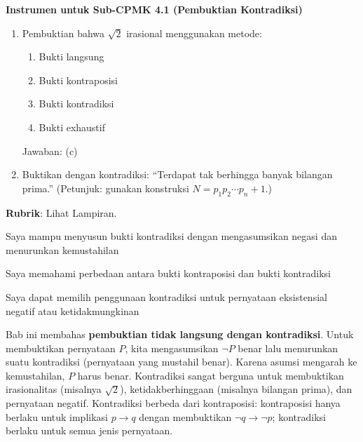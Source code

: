 \documentclass[../main]{subfiles}
\begin{document}
\begin{asesmen}
\textbf{Instrumen untuk Sub-CPMK 4.1 (Pembuktian Kontradiksi)}

\begin{enumerate}
  \item Pembuktian bahwa $\sqrt{2}$ irasional menggunakan metode:
  \begin{enumerate}
    \item Bukti langsung \item Bukti kontraposisi \item Bukti kontradiksi \item Bukti exhaustif
  \end{enumerate}
  Jawaban: (c)

  \item Buktikan dengan kontradiksi: ``Terdapat tak berhingga banyak bilangan prima.'' (Petunjuk: gunakan konstruksi $N = p_1 p_2 \cdots p_n + 1$.)
\end{enumerate}

\textbf{Rubrik}: Lihat Lampiran.
\end{asesmen}

\begin{checklist}
  \item Saya mampu menyusun bukti kontradiksi dengan mengasumsikan negasi dan menurunkan kemustahilan
  \item Saya memahami perbedaan antara bukti kontraposisi dan bukti kontradiksi
  \item Saya dapat memilih penggunaan kontradiksi untuk pernyataan eksistensial negatif atau ketidakmungkinan
\end{checklist}

\begin{rangkuman}
Bab ini membahas \textbf{pembuktian tidak langsung dengan kontradiksi}. Untuk membuktikan pernyataan $P$, kita mengasumsikan $\neg P$ benar lalu menurunkan suatu kontradiksi (pernyataan yang mustahil benar). Karena asumsi mengarah ke kemustahilan, $P$ harus benar. Kontradiksi sangat berguna untuk membuktikan irasionalitas (misalnya $\sqrt{2}$), ketidakberhinggaan (misalnya bilangan prima), dan pernyataan negatif. Kontradiksi berbeda dari kontraposisi: kontraposisi hanya berlaku untuk implikasi $p \rightarrow q$ dengan membuktikan $\neg q \rightarrow \neg p$; kontradiksi berlaku untuk semua jenis pernyataan.
\end{rangkuman}

\ifSubfilesClassLoaded{
  \renewcommand{\bibname}{Daftar Pustaka}
  
  
}{}
\end{document}
